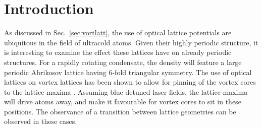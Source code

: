 \section{Introduction}

\iffalse

\fi

As discussed in Sec.~\ref{sec:vortlatt}, the use of optical lattice potentials are ubiquitous in the field of ultracold atoms. Given their highly periodic structure, it is interesting to examine the effect these lattices have on already periodic structures. For a rapidly rotating condensate, the density will feature a large periodic Abrikosov lattice having $6$-fold triangular symmetry. The use of optical lattices on vortex lattices has been shown to allow for pinning of the vortex cores to the lattice maxima \cite{Duine,Cornell}. Assuming blue detuned laser fields, the lattice maxima will drive atoms away, and make it favourable for vortex cores to sit in these positions. The observance of a transition between lattice geometries can be observed in these cases.

